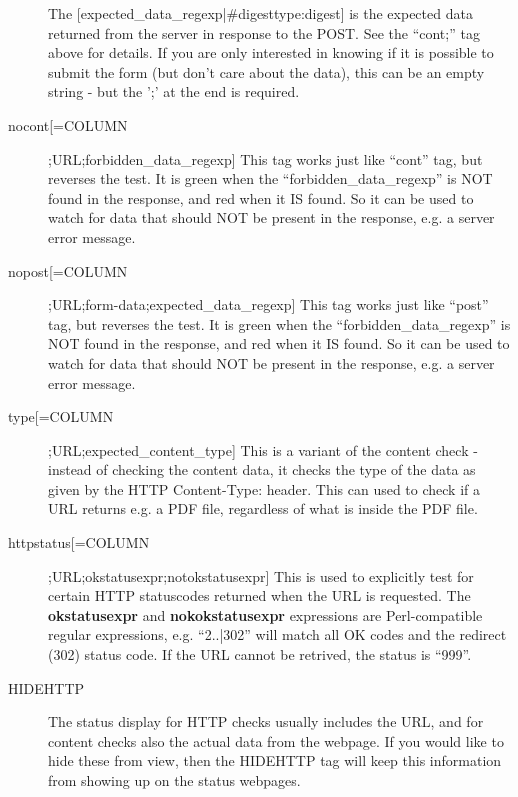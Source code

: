 \begin{description}
  The [expected\_data\_regexp|\#digesttype:digest] is the expected
  data returned from the server in response to the POST. See the
  ``cont;'' tag above for details. If you are only interested in
  knowing if it is possible to submit the form (but don't care about
  the data), this can be an empty string - but the ';' at the end is
  required. 



 

\item[nocont[=COLUMN];URL;forbidden\_data\_regexp] This tag works just
  like ``cont'' tag, but reverses the test. It is green when the
  ``forbidden\_data\_regexp'' is NOT found in the response, and red
  when it IS found. So it can be used to watch for data that should
  NOT be present in the response, e.g. a server error message. 


 

\item[nopost[=COLUMN];URL;form-data;expected\_data\_regexp] This tag
  works just like ``post'' tag, but reverses the test. It is green
  when the ``forbidden\_data\_regexp'' is NOT found in the response,
  and red when it IS found. So it can be used to watch for data that
  should NOT be present in the response, e.g. a server error message. 


 

\item[type[=COLUMN];URL;expected\_content\_type] This is a variant of
  the content check - instead of checking the content data, it checks
  the type of the data as given by the HTTP Content-Type: header. This
  can used to check if a URL returns e.g. a PDF file, regardless of
  what is inside the PDF file. 


 

\item[httpstatus[=COLUMN];URL;okstatusexpr;notokstatusexpr] This is
  used to explicitly test for certain HTTP statuscodes returned when
  the URL is requested. The \textbf{okstatusexpr} and
  \textbf{nokokstatusexpr} expressions are Perl-compatible regular
  expressions, e.g. ``2..|302'' will match all OK codes and the
  redirect (302) status code. If the URL cannot be retrived, the
  status is ``999''. 


 

\item[HIDEHTTP] The status display for HTTP checks usually includes
  the URL, and for content checks also the actual data from the
  webpage. If you would like to hide these from view, then the
  HIDEHTTP tag will keep this information from showing up on the
  status webpages. 



\end{description}
